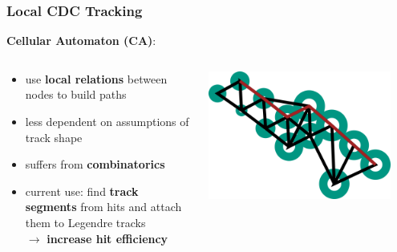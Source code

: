 \documentclass[18pt, aspectratio=169]{beamer}
\newcommand{\greenbold}[1]{\textcolor{kit-green100}{\bf{#1}}}
\newcommand{\orangebold}[1]{\textcolor{kit-orange100}{\bf{#1}}}
\begin{document}
\begin{frame}
  \frametitle{Local CDC Tracking}
  \textbf{Cellular Automaton (CA)}:
  \begin{columns}
    \begin{column}{.6\textwidth}
      \begin{itemize}
      \item use \greenbold{local relations} between nodes to build paths
      \item less dependent on assumptions of track shape
      \item suffers from \greenbold{combinatorics}
      \item current use: find \greenbold{track segments} from hits and attach them to Legendre tracks\\
        $\rightarrow$ \orangebold{increase hit efficiency}
      \end{itemize}
    \end{column}
    \begin{column}{.4\textwidth}
      \includegraphics[width=0.9\textwidth]{figures/segment_selected.png}
    \end{column}
  \end{columns}
  
\end{frame}
\end{document}
